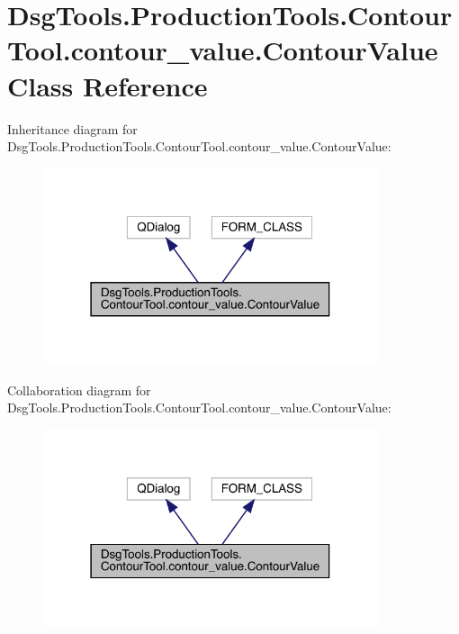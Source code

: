 \hypertarget{class_dsg_tools_1_1_production_tools_1_1_contour_tool_1_1contour__value_1_1_contour_value}{}\section{Dsg\+Tools.\+Production\+Tools.\+Contour\+Tool.\+contour\+\_\+value.\+Contour\+Value Class Reference}
\label{class_dsg_tools_1_1_production_tools_1_1_contour_tool_1_1contour__value_1_1_contour_value}


Inheritance diagram for Dsg\+Tools.\+Production\+Tools.\+Contour\+Tool.\+contour\+\_\+value.\+Contour\+Value\+:
\nopagebreak
\begin{figure}[H]
\begin{center}
\leavevmode
\includegraphics[width=279pt]{class_dsg_tools_1_1_production_tools_1_1_contour_tool_1_1contour__value_1_1_contour_value__inherit__graph}
\end{center}
\end{figure}


Collaboration diagram for Dsg\+Tools.\+Production\+Tools.\+Contour\+Tool.\+contour\+\_\+value.\+Contour\+Value\+:
\nopagebreak
\begin{figure}[H]
\begin{center}
\leavevmode
\includegraphics[width=279pt]{class_dsg_tools_1_1_production_tools_1_1_contour_tool_1_1contour__value_1_1_contour_value__coll__graph}
\end{center}
\end{figure}
